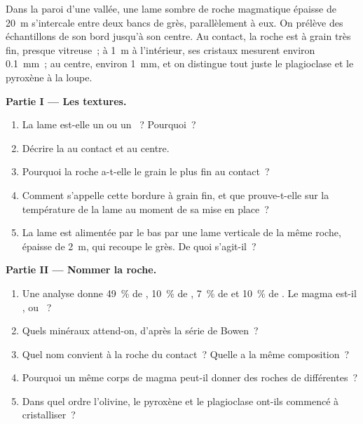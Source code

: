 \begin{problem}
\label{pb:g11:igneous-rocks:1}
Dans la paroi d'une vallée, une lame sombre de roche magmatique épaisse de
\qty{20}{m} s'intercale entre deux bancs de grès, parallèlement à eux. On
prélève des échantillons de son bord jusqu'à son centre. Au contact, la
roche est à grain très fin, presque vitreuse~; à \qty{1}{m} à l'intérieur,
ses cristaux mesurent environ \qty{0.1}{mm}~; au centre, environ
\qty{1}{mm}, et on distingue tout juste le plagioclase et le pyroxène à la
loupe.

\medskip
\noindent\textbf{Partie I --- Les textures.}
\begin{enumerate}
  \item La lame est-elle un  ou un ~? Pourquoi~?
  \item Décrire la  au contact et au centre.
  \item Pourquoi la roche a-t-elle le grain le plus fin au contact~?
  \item Comment s'appelle cette bordure à grain fin, et que prouve-t-elle
        sur la température de la lame au moment de sa mise en place~?
  \item La lame est alimentée par le bas par une lame verticale de la même
        roche, épaisse de \qty{2}{m}, qui recoupe le grès. De quoi
        s'agit-il~?
\end{enumerate}

\medskip
\noindent\textbf{Partie II --- Nommer la roche.}
\begin{enumerate}[resume]
  \item Une analyse donne \qty{49}{\percent} de ,
        \qty{10}{\percent} de , \qty{7}{\percent} de  et
        \qty{10}{\percent} de . Le magma est-il ,
         ou ~?
  \item Quels minéraux attend-on, d'après la série de Bowen~?
  \item Quel nom convient à la roche du contact~? Quelle  a
        la même composition~?
  \item Pourquoi un même corps de magma peut-il donner des roches de
         différentes~?
  \item Dans quel ordre l'olivine, le pyroxène et le plagioclase ont-ils
        commencé à cristalliser~?
\end{enumerate}


\end{problem}
